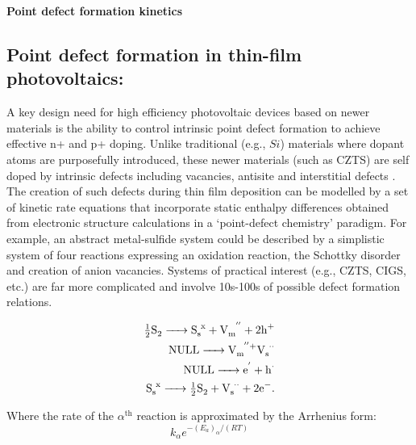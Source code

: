 \documentclass[11pt]{article}
\begin{document}
\begin{center}
{\Large{\textbf{Point defect formation kinetics}}}
\end{center}

 
\subsection*{Point defect formation in thin-film photovoltaics:}
A key design need for high efficiency photovoltaic devices based on
newer materials is the ability to control intrinsic point defect
formation to achieve effective n+ and p+ doping. Unlike traditional
(e.g., $Si$) materials where dopant atoms are purposefully introduced,
these newer materials (such as CZTS) are self doped by intrinsic
defects including vacancies, antisite and interstitial defects
\cite{JiangY13}. The creation of such defects during thin film
deposition can be modelled by a set of kinetic rate equations that
incorporate static enthalpy differences obtained from electronic
structure calculations \cite{ref} in a `point-defect chemistry'
paradigm. For example, an abstract metal-sulfide system could be
described by a simplistic system of four reactions expressing an
oxidation reaction, the Schottky disorder and creation of anion
vacancies. Systems of practical interest (e.g., CZTS, CIGS, etc.) are
far more complicated and involve 10s-100s of possible defect formation
relations. 

\begin{eqnarray*}
\ce{ \tfrac{1}{2} S2 -> S_s^x + V_m^{''} + 2 h^+ } \\
\ce{ NULL -> V_m^{''}+ V_s^{$\cdot \cdot$} } \\
\ce{ NULL -> e^' + h^{$\cdot$} } \\
\ce{ S_s^x -> \tfrac{1}{2} S2 + V_s^{$\cdot \cdot$} + 2 e^- }.
\end{eqnarray*}

Where the rate of the $\alpha^{\mathrm{th}}$ reaction is approximated
by the Arrhenius form:
\begin{equation}
  \label{eq:1}
  k_\alpha e^{-(E_a)_\alpha/(RT)}
\end{equation}
\end{document}
